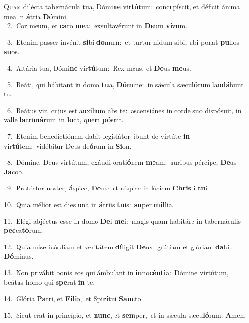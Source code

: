 \lettrine{\initial\textcolor{\initialcolor}{Q}}{uam} dilécta tabernácula tua, Dómi\textbf{ne} vir\-\textbf{tú}\-tum:~\star concupíscit, et déficit ánima mea in \textbf{á}\-tria \textbf{Dó}\-mini.\\
{\numbfont\textcolor{\numbcolor}{~2.}}~Cor meum, et \textbf{ca}\-ro \textbf{me}\-a:~\star exsultavérunt in \textbf{De}\-um \textbf{vi}\-vum.\par
{\numbfont\textcolor{\numbcolor}{~3.}}~Etenim passer invénit \textbf{si}\-bi \textbf{do}\-mum:~\star et turtur nidum sibi, ubi ponat \textbf{pul}\-los \textbf{su}\-os.\par
{\numbfont\textcolor{\numbcolor}{~4.}}~Altária tua, Dómi\textbf{ne} vir\-\textbf{tú}\-tum:~\star Rex meus, et \textbf{De}\-us \textbf{me}\-us.\par
{\numbfont\textcolor{\numbcolor}{~5.}}~Beáti, qui hábitant in domo \textbf{tu}\-a, \textbf{Dó}\-\textbf{mi}ne:~\star in sǽcula sæcu\-\textbf{ló}\-rum lau\-\textbf{dá}\-bunt te.\par
{\numbfont\textcolor{\numbcolor}{~6.}}~Beátus vir, cujus est auxílium abs te:~\dagger ascensiónes in corde suo dispósuit, in valle \textbf{la}\-cri\-\textbf{má}\-rum~\star in \textbf{lo}\-co, quem \textbf{pó}\-suit.\par
{\numbfont\textcolor{\numbcolor}{~7.}}~Etenim benedictiónem dabit legislátor~\dagger ibunt de virtúte \textbf{in} vir\-\textbf{tú}\-tem:~\star vidébitur Deus de\-\textbf{ó}\-rum in \textbf{Si}\-on.\par
{\numbfont\textcolor{\numbcolor}{~8.}}~Dómine, Deus virtútum, exáudi orati\-\textbf{ó}\-nem \textbf{me}\-am:~\star áuribus pércipe, \textbf{De}\-us \textbf{Ja}\-cob.\par
{\numbfont\textcolor{\numbcolor}{~9.}}~Protéctor noster, \textbf{á}\-spice, \textbf{De}\-us:~\star et réspice in fáciem \textbf{Chris}\-ti \textbf{tu}\-i.\par
{\numbfont\textcolor{\numbcolor}{10.}}~Quia mélior est dies una in \textbf{á}\-triis \textbf{tu}\-is:~\star \textbf{su}\-per \textbf{míl}\-lia.\par
{\numbfont\textcolor{\numbcolor}{11.}}~Elégi abjéctus esse in domo \textbf{De}\-i \textbf{me}\-i:~\star magis quam habitáre in tabernáculis \textbf{pec}\-ca\-\textbf{tó}\-rum.\par
{\numbfont\textcolor{\numbcolor}{12.}}~Quia misericórdiam et veritátem \textbf{dí}\-ligit \textbf{De}\-us:~\star grátiam et glóriam \textbf{da}\-bit \textbf{Dó}\-minus.\par
{\numbfont\textcolor{\numbcolor}{13.}}~Non privábit bonis eos qui ámbulant in \textbf{in}\-no\-\textbf{cén}\-\textbf{ti}a:~\star Dómine virtútum, beátus homo qui \textbf{spe}\-rat \textbf{in} te.\par
{\numbfont\textcolor{\numbcolor}{14.}}~Glória \textbf{Pa}\-tri, et \textbf{Fí}\-\textbf{li}o,~\star et Spi\-\textbf{rí}\-tui \textbf{Sanc}\-to.\par
{\numbfont\textcolor{\numbcolor}{15.}}~Sicut erat in princípio, et \textbf{nunc}\-, et \textbf{sem}\-per,~\star et in sǽcula sæcu\-\textbf{ló}\-rum. \textbf{A}\-men.\par

